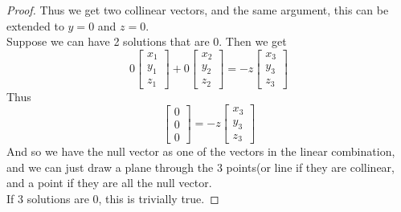 \documentclass[12pt]{article}   %
\begin{document}
\begin{proof}
Thus we get two collinear vectors, and the same argument, this can be extended to $y=0$ and $z=0$.\\
Suppose we can have 2 solutions that are 0. Then we get 
\[0\begin{bmatrix}x_1\\y_1\\z_1\end{bmatrix}+
0\begin{bmatrix}x_2\\y_2\\z_2\end{bmatrix}=
-z\begin{bmatrix}x_3\\y_3\\z_3\end{bmatrix}\]
Thus \[\begin{bmatrix}0\\0\\0\end{bmatrix}=
-z\begin{bmatrix}x_3\\y_3\\z_3\end{bmatrix}\]
And so we have the null vector as one of the vectors in the linear combination, and we can just draw a plane through the 3 points(or line if they are collinear, and a point if they are all the null vector.\\
If 3 solutions are 0, this is trivially true.
\end{proof}
\end{document}

